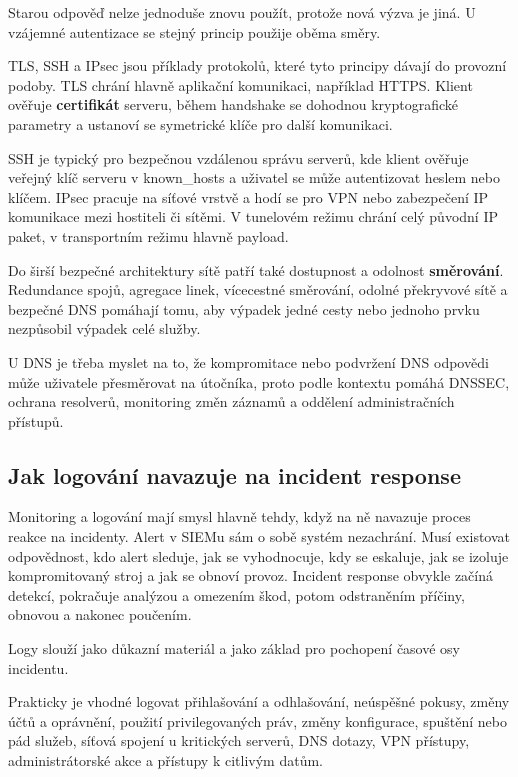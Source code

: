 \documentclass[11pt,a4paper]{article}
\begin{document}
Starou odpověď nelze jednoduše znovu použít, protože nová výzva je jiná. U vzájemné autentizace se stejný princip použije oběma směry.

TLS, SSH a IPsec jsou příklady protokolů, které tyto principy dávají do provozní podoby. TLS chrání hlavně aplikační komunikaci, například HTTPS. Klient ověřuje \textbf{certifikát} serveru, během handshake se dohodnou kryptografické parametry a ustanoví se symetrické klíče pro další komunikaci.

SSH je typický pro bezpečnou vzdálenou správu serverů, kde klient ověřuje veřejný klíč serveru v known\_hosts a uživatel se může autentizovat heslem nebo klíčem. IPsec pracuje na síťové vrstvě a hodí se pro VPN nebo zabezpečení IP komunikace mezi hostiteli či sítěmi. V tunelovém režimu chrání celý původní IP paket, v transportním režimu hlavně payload.

Do širší bezpečné architektury sítě patří také dostupnost a odolnost \textbf{směrování}. Redundance spojů, agregace linek, vícecestné směrování, odolné překryvové sítě a bezpečné DNS pomáhají tomu, aby výpadek jedné cesty nebo jednoho prvku nezpůsobil výpadek celé služby.

U DNS je třeba myslet na to, že kompromitace nebo podvržení DNS odpovědi může uživatele přesměrovat na útočníka, proto podle kontextu pomáhá DNSSEC, ochrana resolverů, monitoring změn záznamů a oddělení administračních přístupů.

\subsection*{Jak logování navazuje na incident response}

Monitoring a logování mají smysl hlavně tehdy, když na ně navazuje proces reakce na incidenty. Alert v SIEMu sám o sobě systém nezachrání. Musí existovat odpovědnost, kdo alert sleduje, jak se vyhodnocuje, kdy se eskaluje, jak se izoluje kompromitovaný stroj a jak se obnoví provoz. Incident response obvykle začíná detekcí, pokračuje analýzou a omezením škod, potom odstraněním příčiny, obnovou a nakonec poučením.

Logy slouží jako důkazní materiál a jako základ pro pochopení časové osy incidentu.

Prakticky je vhodné logovat přihlašování a odhlašování, neúspěšné pokusy, změny účtů a oprávnění, použití privilegovaných práv, změny konfigurace, spuštění nebo pád služeb, síťová spojení u kritických serverů, DNS dotazy, VPN přístupy, administrátorské akce a přístupy k citlivým datům.
\end{document}
